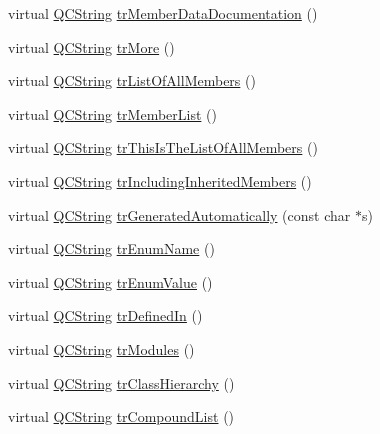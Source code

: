 \begin{DoxyCompactItemize}
\item 
virtual \mbox{\hyperlink{class_q_c_string}{Q\+C\+String}} \mbox{\hyperlink{class_translator_chinese_a46981e79d304b17e88c5d2bef7d362eb}{tr\+Member\+Data\+Documentation}} ()
\item 
virtual \mbox{\hyperlink{class_q_c_string}{Q\+C\+String}} \mbox{\hyperlink{class_translator_chinese_ab0054ca2bf47c0cb2e13568a7081cf05}{tr\+More}} ()
\item 
virtual \mbox{\hyperlink{class_q_c_string}{Q\+C\+String}} \mbox{\hyperlink{class_translator_chinese_af2ff6462a0490ba6985a1e36db2a2610}{tr\+List\+Of\+All\+Members}} ()
\item 
virtual \mbox{\hyperlink{class_q_c_string}{Q\+C\+String}} \mbox{\hyperlink{class_translator_chinese_a24a30311c329007ed54d7f98c47aa641}{tr\+Member\+List}} ()
\item 
virtual \mbox{\hyperlink{class_q_c_string}{Q\+C\+String}} \mbox{\hyperlink{class_translator_chinese_a2815a5744c7c75d3c938e56ce10d6d1b}{tr\+This\+Is\+The\+List\+Of\+All\+Members}} ()
\item 
virtual \mbox{\hyperlink{class_q_c_string}{Q\+C\+String}} \mbox{\hyperlink{class_translator_chinese_a791614cc46908f5a5e4e70b5b0bd6731}{tr\+Including\+Inherited\+Members}} ()
\item 
virtual \mbox{\hyperlink{class_q_c_string}{Q\+C\+String}} \mbox{\hyperlink{class_translator_chinese_a0311de38f11ad2698b9d20d39cc9bd75}{tr\+Generated\+Automatically}} (const char $\ast$s)
\item 
virtual \mbox{\hyperlink{class_q_c_string}{Q\+C\+String}} \mbox{\hyperlink{class_translator_chinese_a9595d41e3a338e6e71d6e52cb215f73e}{tr\+Enum\+Name}} ()
\item 
virtual \mbox{\hyperlink{class_q_c_string}{Q\+C\+String}} \mbox{\hyperlink{class_translator_chinese_a53639b2b66e0959a98363bec0c264bb0}{tr\+Enum\+Value}} ()
\item 
virtual \mbox{\hyperlink{class_q_c_string}{Q\+C\+String}} \mbox{\hyperlink{class_translator_chinese_ade494df6c8ea640c5348000768f06642}{tr\+Defined\+In}} ()
\item 
virtual \mbox{\hyperlink{class_q_c_string}{Q\+C\+String}} \mbox{\hyperlink{class_translator_chinese_a54a38c1d58a1747f726df92a5ce1e59a}{tr\+Modules}} ()
\item 
virtual \mbox{\hyperlink{class_q_c_string}{Q\+C\+String}} \mbox{\hyperlink{class_translator_chinese_ac5f4e458b25badfddf335090ae3c23ed}{tr\+Class\+Hierarchy}} ()
\item 
virtual \mbox{\hyperlink{class_q_c_string}{Q\+C\+String}} \mbox{\hyperlink{class_translator_chinese_acf6ffd64cb26ecbe7cfc7bcbc91a932d}{tr\+Compound\+List}} ()

\end{DoxyCompactItemize}
